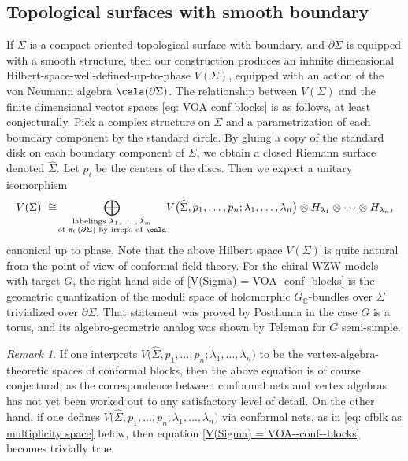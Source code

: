 \documentclass[a4paper,10pt,leqno]{amsart}
\newcommand{\IC}{\mathbb{C}}     \newcommand{\calc}{\mathcal{C}}
\theoremstyle{plain}
\theoremstyle{definition}
\theoremstyle{remark}
\newtheorem{remark}[theorem]{Remark}
\DeclareRobustCommand{\SkipTocEntry}[5]{}
\begin{document}
\subsection*{Topological surfaces with smooth boundary}
If $\Sigma$ is a compact oriented topological surface with boundary, and $\partial\Sigma$ is equipped with a smooth structure,
then our construction produces an infinite dimensional Hilbert-space-well-defined-up-to-phase $V(\Sigma)$, equipped with an action of the von Neumann algebra $\cala(\partial \Sigma)$.
The relationship between $V(\Sigma)$ and the finite dimensional vector spaces \eqref{eq: VOA conf blocks} is as follows, at least conjecturally.
Pick a complex structure on $\Sigma$ and a parametrization of each boundary component by the standard circle.
By gluing a copy of the standard disk on each boundary component of $\Sigma$, we obtain a closed Riemann surface denoted $\widehat \Sigma$.
Let $p_i$ be the centers of the discs.
Then we expect a unitary isomorphism 
\begin{equation}\label{V(Sigma) = VOA--conf--blocks}
V(\Sigma)\,\, \cong\!
\raisebox{0cm}{$\displaystyle\bigoplus_{\substack{\text{labelings $\lambda_{1},\ldots,\lambda_m$}\\\text{of $\pi_0(\partial \Sigma)$ by irreps of $\cala$}}}
\!V\big(\widehat\Sigma,p_1,\ldots,p_n;\lambda_1,\ldots,\lambda_n\big)\otimes H_{\lambda_1}\otimes \cdots \otimes H_{\lambda_n}
$},
\end{equation}
canonical up to phase. 
Note that the above Hilbert space $V(\Sigma)$ is quite natural from the point of view of conformal field theory.
For the chiral WZW models with target $G$, 
the right hand side of \eqref{V(Sigma) = VOA--conf--blocks} is the geometric quantization of the moduli space of holomorphic $G_\IC$-bundles over $\Sigma$ trivialized over $\partial \Sigma$.
That statement was proved by Posthuma \cite[eq. just below (3.2)]{Posthuma(The-Heisenberg-group-and-conformal-field-theory)} in the case $G$ is a torus,
and its algebro-geometric analog was shown by Teleman \cite[Thm.~4]{Teleman(Borel-Weil-Bott)} for $G$ semi-simple.




\begin{remark}
If one interprets $V\big(\widehat\Sigma,p_1,\ldots,p_n;\lambda_1,\ldots,\lambda_n\big)$ to be the vertex-algebra-theoretic 
spaces of conformal blocks, then the above equation is of course conjectural,
as the correspondence between conformal nets and vertex algebras has not yet been worked out to any satisfactory level of detail.
On the other hand, if one defines $V\big(\widehat\Sigma,p_1,\ldots,p_n;\lambda_1,\ldots,\lambda_n\big)$ via conformal nets, as in \eqref{eq: cfblk as multiplicity space} below,
then equation \eqref{V(Sigma) = VOA--conf--blocks} becomes trivially true.
\end{remark}
\end{document}
